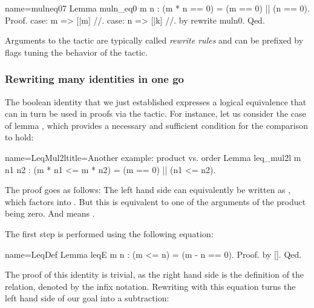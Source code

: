 \begin{coq}{name=mulneq07}{}
Lemma muln_eq0 m n : (m * n == 0) = (m == 0) || (n == 0).
Proof.
case: m => [|m] //.
case: n => [|k] //.
by rewrite muln0.
Qed.
\end{coq}

Arguments to the  tactic are typically called
\emph{rewrite rules} and can
be prefixed by flags tuning the behavior of the tactic.


\subsubsection{Rewriting many identities in one go}
\label{sec:multirew}

The boolean identity  that we just established expresses a
logical equivalence that can in turn be used in proofs via the
 tactic. For instance, let us consider the case of lemma
, which provides a necessary and sufficient condition
for the comparison  to hold:

\begin{coq}{name=LeqMul2l}{title=Another example: product vs. order}
Lemma leq_mul2l m n1 n2 : (m * n1 <= m * n2) = (m == 0) || (n1 <= n2).
\end{coq}

The proof goes as follows: The left
hand side can equivalently be written as , which
factors into . But this is equivalent to one
of the arguments of the product being zero. And 
means .

The first step is performed using the following equation:

\begin{coq}{name=LeqDef}{}
Lemma leqE m n : (m <= n) = (m - n == 0).
Proof. by []. Qed.
\end{coq}

The proof of this identity is trivial, as the right hand side is the
definition of the  relation, denoted by the \C{<=} infix
notation. Rewriting with this equation turns the left hand side of our
goal into a subtraction:

